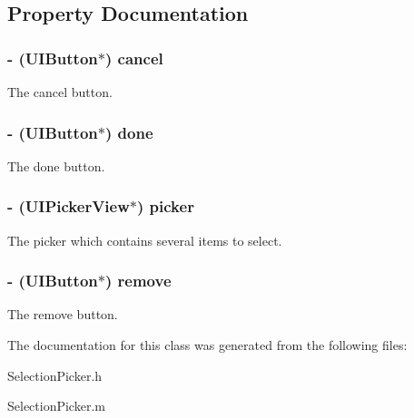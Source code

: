 \subsection{\-Property \-Documentation}
\hypertarget{interface_selection_picker_ad419e9278ed75268dda0e48c5ce43822}{
\subsubsection[{cancel}]{\setlength{\rightskip}{0pt plus 5cm}-\/ (\-U\-I\-Button$\ast$) {\bf cancel}}}\label{interface_selection_picker_ad419e9278ed75268dda0e48c5ce43822}
\-The cancel button. \hypertarget{interface_selection_picker_aa43b12e68fd0c7c20745380fc60b6b88}{
\subsubsection[{done}]{\setlength{\rightskip}{0pt plus 5cm}-\/ (\-U\-I\-Button$\ast$) {\bf done}}}\label{interface_selection_picker_aa43b12e68fd0c7c20745380fc60b6b88}
\-The done button. \hypertarget{interface_selection_picker_aa2a3f2d050d8e454ee7158ab17735c5f}{
\subsubsection[{picker}]{\setlength{\rightskip}{0pt plus 5cm}-\/ (\-U\-I\-Picker\-View$\ast$) {\bf picker}}}\label{interface_selection_picker_aa2a3f2d050d8e454ee7158ab17735c5f}
\-The picker which contains several items to select. \hypertarget{interface_selection_picker_a060c08f65fc47029ed1902e796a03925}{
\subsubsection[{remove}]{\setlength{\rightskip}{0pt plus 5cm}-\/ (\-U\-I\-Button$\ast$) {\bf remove}}}\label{interface_selection_picker_a060c08f65fc47029ed1902e796a03925}
\-The remove button. 

\-The documentation for this class was generated from the following files\-:\begin{DoxyCompactItemize}
\item 
\-Selection\-Picker.\-h\item 
\-Selection\-Picker.\-m\end{DoxyCompactItemize}
